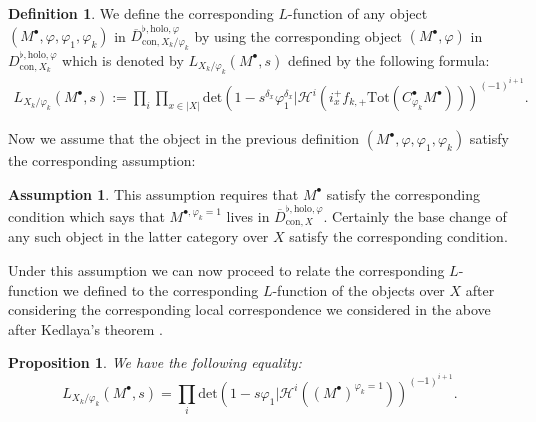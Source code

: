 \documentclass[11pt]{book}
\newtheorem{proposition}[theorem]{Proposition}
\theoremstyle{definition}
\newtheorem{definition}[theorem]{Definition}
\numberwithin{equation}{section}
\newtheorem{assumption}[theorem]{Assumption}
\begin{document}
\begin{definition} 
We define the corresponding $L$-function of any object $(M^\bullet,\varphi,\varphi_1,\varphi_k)$ in $\overline{D}^{\flat,\mathrm{holo},\varphi}_{\mathrm{con},X_k/\varphi_k}$ by using the corresponding object $(M^\bullet,\varphi)$ in $D^{\flat,\mathrm{holo},\varphi}_{\mathrm{con},X_k}$ which is denoted by $L_{X_k/\varphi_k}(M^\bullet,s)$ defined by the following formula:
\begin{align}
L_{X_k/\varphi_k}(M^\bullet,s):=\prod_i\prod_{x\in |X|}\mathrm{det}\left(1-s^{\delta_x}\varphi_1^{\delta_x}|\mathcal{H}^i(i_{x}^+f_{k,+}\mathrm{Tot}(C^\bullet_{\varphi_k}M^\bullet))\right)^{(-1)^{i+1}}. 
\end{align}	
\end{definition}
 

\indent Now we assume that the object in the previous definition $(M^\bullet,\varphi,\varphi_1,\varphi_k)$ satisfy the corresponding assumption:

\begin{assumption} \label{assumption6.5}
This assumption requires that $M^\bullet$ satisfy the corresponding condition which says that $M^{\bullet,\varphi_k=1}$ lives in $\overline{D}^{\flat,\mathrm{holo},\varphi}_{\mathrm{con},X}$. Certainly the base change of any such object in the latter category over $X$ satisfy the corresponding condition.
\end{assumption}

	
\indent Under this assumption we can now proceed to relate the corresponding $L$-function we defined to the corresponding $L$-function of the objects over $X$ after considering the corresponding local correspondence we considered in the above after Kedlaya's theorem \cite[Theorem 7.3, Corollary 7.4, Lemma 7.2]{Ked9}.





\begin{proposition}
We have the following equality:
\begin{displaymath}
L_{X_k/\varphi_k}(M^\bullet,s)= \prod_i\mathrm{det}\left(1-s\varphi_1|\mathcal{H}^i((M^\bullet)^{\varphi_k=1})\right)^{(-1)^{i+1}}.
\end{displaymath}
	
\end{proposition}
\end{document}
